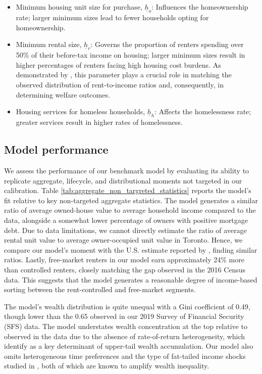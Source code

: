\documentclass[parskip=full]{article}
\begin{document}
\begin{itemize}
    \item Minimum housing unit size for purchase, $\underline{h}_{o}$: Influences the homeownership rate; larger minimum sizes lead to fewer households opting for homeownership.
    \item Minimum rental size, $\underline{h}_{r}$: Governs the proportion of renters spending over 50\% of their before-tax income on housing; larger minimum sizes result in higher percentages of renters facing high housing cost burdens. As demonstrated by \citet{rs-2023}, this parameter plays a crucial role in matching the observed distribution of rent-to-income ratios and, consequently, in determining welfare outcomes.
    \item Housing services for homeless households, $\underline{h}_{h}$: Affects the homelessness rate; greater services result in higher rates of homelessness.
\end{itemize}

\subsection{Model performance}\label{sec:non_targeted_statistics}

We assess the performance of our benchmark model by evaluating its ability to replicate aggregate, lifecycle, and distributional moments not targeted in our calibration. Table \ref{tab:aggregate_non_targreted_statistics} reports the model's fit relative to key non-targeted aggregate statistics. The model generates a similar ratio of average owned-house value to average household income compared to the data, alongside a somewhat lower percentage of owners with positive mortgage debt. Due to data limitations, we cannot directly estimate the ratio of average rental unit value to average owner-occupied unit value in Toronto. Hence, we compare our model's moment with the U.S. estimate reported by \citet{chatterjee-eyigungor-2015}, finding similar ratios. Lastly, free-market renters in our model earn approximately 24\% more than controlled renters, closely matching the gap observed in the 2016 Census data. This suggests that the model generates a reasonable degree of income-based sorting between the rent-controlled and free-market segments.

The model's wealth distribution is quite unequal with a Gini coefficient of 0.49, though lower than the 0.65 observed in our 2019 Survey of Financial Security (SFS) data. The model understates wealth concentration at the top relative to observed in the data due to the absence of rate-of-return heterogeneity, which \citet{fagereng} identify as a key determinant of upper-tail wealth accumulation. Our model also omits heterogeneous time preferences \citep{ks-1998} and the type of fat-tailed income shocks studied in \citet{mj-shocks}, both of which are known to amplify wealth inequality.
\end{document}
